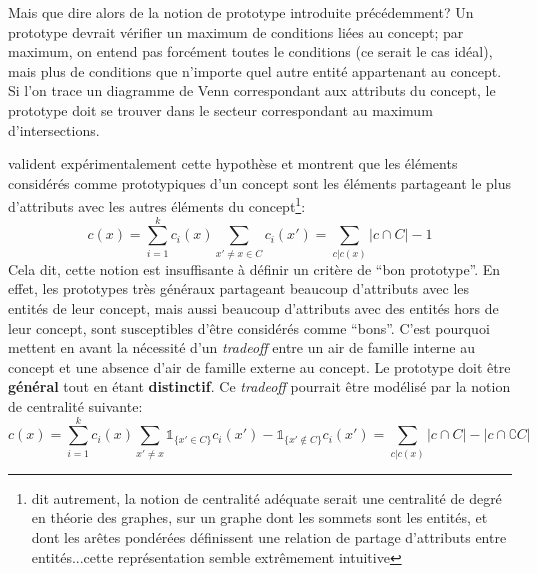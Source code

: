 \documentclass[french]{article}
\begin{document}
				Mais que dire alors de la notion de prototype introduite précédemment? Un prototype devrait vérifier un maximum de conditions liées au concept; par maximum, on entend pas forcément toutes le conditions (ce serait le cas idéal), mais plus de conditions que n'importe quel autre entité appartenant au concept. Si l'on trace un diagramme de Venn correspondant aux attributs du concept, le prototype doit se trouver dans le secteur correspondant au maximum d'intersections.
				\begin{figure}[H]
					\centering
				\end{figure}
				\cite{rosch1975} valident expérimentalement cette hypothèse et montrent que les éléments considérés comme prototypiques d'un concept sont les éléments partageant le plus d'attributs avec les autres éléments du concept\footnote{dit autrement, la notion de centralité adéquate serait une centralité de degré en théorie des graphes, sur un graphe dont les sommets sont les entités, et dont les arêtes pondérées définissent une relation de partage d'attributs entre entités...cette représentation semble extrêmement intuitive}:
				\begin{equation*}
				c(x) = \sum_{i = 1}^{k}c_i(x)\sum_{x' \neq x \in C}c_i(x') = \sum_{c| c(x)}|c\cap C|-1
				\end{equation*}
				Cela dit, cette notion est insuffisante à définir un critère de ``bon prototype''. En effet, les prototypes très généraux partageant beaucoup d'attributs avec les entités de leur concept, mais aussi beaucoup d'attributs avec des entités hors de leur concept, sont susceptibles d'être considérés comme ``bons''. C'est pourquoi \cite{rosch1975} mettent en avant la nécessité d'un \textit{tradeoff} entre un air de famille interne au concept et une absence d'air de famille externe au concept. Le prototype doit être \textbf{général} tout en étant \textbf{distinctif}. Ce \textit{tradeoff} pourrait être modélisé par la notion de centralité suivante:
				\begin{equation*}
				c(x) = \sum_{i = 1}^{k}c_i(x)\sum_{x' \neq x}\mathds{1}_{\lbrace x' \in C \rbrace}c_i(x') - \mathds{1}_{\lbrace x' \notin C \rbrace}c_i(x') = \sum_{c| c(x)}|c\cap C| - |c \cap \complement C|
				\end{equation*}
\end{document}
